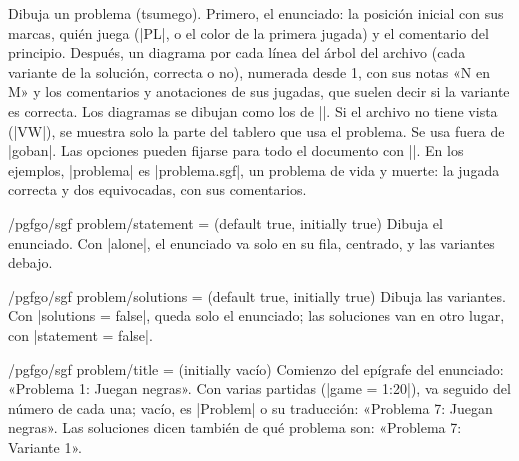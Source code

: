 \begin{command}{\sgfproblem{}}
	Dibuja un problema (tsumego). Primero, el enunciado: la posición inicial con sus marcas, quién juega (|PL|, o el color de la primera jugada) y el comentario del principio. Después, un diagrama por cada línea del árbol del archivo (cada variante de la solución, correcta o no), numerada desde 1, con sus notas «N en M» y los comentarios y anotaciones de sus jugadas, que suelen decir si la variante es correcta. Los diagramas se dibujan como los de |\sgfdiagrams|. Si el archivo no tiene vista (|VW|), se muestra solo la parte del tablero que usa el problema. Se usa fuera de |goban|. Las opciones pueden fijarse para todo el documento con ||. En los ejemplos, |problema| es |problema.sgf|, un problema de vida y muerte: la jugada correcta y dos equivocadas, con sus comentarios.

	\begin{codeexample}
	\end{codeexample}
\end{command}


\begin{key}{/pgfgo/sgf problem/statement =  (default true, initially true)}
	Dibuja el enunciado. Con |alone|, el enunciado va solo en su fila, centrado, y las variantes debajo.
\end{key}

\begin{key}{/pgfgo/sgf problem/solutions =  (default true, initially true)}
	Dibuja las variantes. Con |solutions = false|, queda solo el enunciado; las soluciones van en otro lugar, con |statement = false|.

	\begin{codeexample}
	\end{codeexample}

\end{key}

\begin{key}{/pgfgo/sgf problem/title =  (initially vacío)}
	Comienzo del epígrafe del enunciado: «Problema 1: Juegan negras». Con varias partidas (|game = 1:20|), va seguido del número de cada una; vacío, es |Problem| o su traducción: «Problema 7: Juegan negras». Las soluciones dicen también de qué problema son: «Problema 7: Variante 1».
\end{key}

